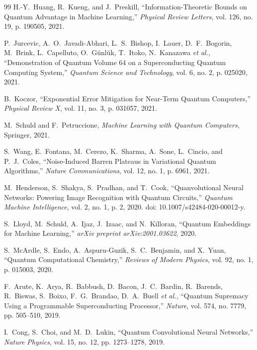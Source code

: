 \documentclass[pdflatex,sn-mathphys-num]{sn-jnl}%
\theoremstyle{thmstyleone}%
\theoremstyle{thmstyletwo}%
\theoremstyle{thmstylethree}%
\begin{document}
\begin{thebibliography}{99}
H.-Y.~Huang, R.~Kueng, and J.~Preskill,
``Information-Theoretic Bounds on Quantum Advantage in Machine Learning,''
\emph{Physical Review Letters}, vol. 126, no. 19,
p. 190505, 2021.

P.~Jurcevic, A.~O.~Javadi-Abhari, L.~S.~Bishop, I.~Lauer,
D.~F.~Bogorin, M.~Brink, L.~Capelluto, O.~G{\"u}nl{\"u}k,
T.~Itoko, N.~Kanazawa \emph{et al.},
``Demonstration of Quantum Volume 64 on a Superconducting Quantum Computing System,''
\emph{Quantum Science and Technology}, vol. 6, no. 2,
p. 025020, 2021.

B.~Koczor,
``Exponential Error Mitigation for Near-Term Quantum Computers,''
\emph{Physical Review X}, vol. 11, no. 3, p. 031057, 2021.

M.~Schuld and F.~Petruccione,
\emph{Machine Learning with Quantum Computers},
Springer, 2021.

S.~Wang, E.~Fontana, M.~Cerezo, K.~Sharma, A.~Sone,
L.~Cincio, and P.~J.~Coles,
``Noise-Induced Barren Plateaus in Variational Quantum Algorithms,''
\emph{Nature Communications}, vol. 12, no. 1, p. 6961, 2021.

M.~Henderson, S.~Shakya, S.~Pradhan, and T.~Cook,
``Quanvolutional Neural Networks: Powering Image Recognition with Quantum Circuits,''
\emph{Quantum Machine Intelligence}, vol. 2, no. 1, p. 2, 2020.
doi: 10.1007/s42484-020-00012-y.

S.~Lloyd, M.~Schuld, A.~Ijaz, J.~Izaac, and N.~Killoran,
``Quantum Embeddings for Machine Learning,''
\emph{arXiv preprint arXiv:2001.03622}, 2020.

S.~McArdle, S.~Endo, A.~Aspuru-Guzik, S.~C.~Benjamin,
and X.~Yuan,
``Quantum Computational Chemistry,''
\emph{Reviews of Modern Physics}, vol. 92, no. 1,
p. 015003, 2020.

F.~Arute, K.~Arya, R.~Babbush, D.~Bacon, J.~C.~Bardin,
R.~Barends, R.~Biswas, S.~Boixo, F.~G.~Brandao,
D.~A.~Buell \emph{et al.},
``Quantum Supremacy Using a Programmable Superconducting Processor,''
\emph{Nature}, vol. 574, no. 7779,
pp. 505--510, 2019.

I.~Cong, S.~Choi, and M.~D.~Lukin,
``Quantum Convolutional Neural Networks,''
\emph{Nature Physics}, vol. 15, no. 12,
pp. 1273--1278, 2019.


\end{thebibliography}
\end{document}
